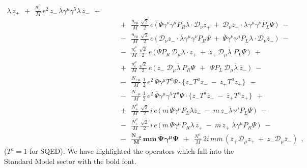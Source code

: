 \documentclass[12pt]{revtex4}
\begin{document}
\begin{eqnarray}
\lambda\, z_+ 
~~+~~
\frac{n_{\bar{e}}^\mu}{M}\, e^2\,
z_-\, \overline{\lambda}\gamma^\mu\gamma^5
\lambda\, \overline{z}_-
~~+~~ \\
\nonumber
&&
~~+~~
\frac{n_{e\mu}}{M}\,
\frac{\sqrt{2}}{2}\, e\,
\Big(\,
\overline{\Psi} \gamma^\nu\gamma^\mu P_R
\lambda \cdot \mathcal{D}_\nu z_+ 
~+~
\mathcal{D}_\nu \overline{z}_+ \cdot
\overline{\lambda} \gamma^\mu \gamma^\nu
P_L \Psi
\,
\Big)
~~-~~ \\
\nonumber
&&
~~-~~
\frac{n_{\bar{e}\mu}}{M}\,
\frac{\sqrt{2}}{2}\,e\,
\Big(\,
\mathcal{D}_\nu z_- \cdot
\overline{\lambda}\gamma^\mu\gamma^\nu P_R \Psi
~+~
\overline{\Psi}\gamma^\nu\gamma^\mu P_L \lambda
\cdot \mathcal{D}_\nu \overline{z}_-
\,
\Big)
~~-~~ \\
\label{LV_matter_component}
&&
~~-~~
\frac{n_e^\mu}{M}\,
\frac{\sqrt{2}}{2}\, e\,
\Big(\,
\overline{\Psi}P_R\, \mathcal{D}_\mu \lambda
\cdot z_+ 
~+~
\overline{z}_+ \,
\mathcal{D}_\mu 
\overline{\lambda}\; P_L \Psi
\,\Big)
~~+~~ \\
\nonumber
&&
~~+~~
\frac{n_{\bar{e}}^\mu}{M}\,
\frac{\sqrt{2}}{2}\, e\,
\Big(\,
z_-\; \mathcal{D}_\mu \overline{\lambda} ~
P_R \Psi 
~~+~~
\Psi P_L \, \mathcal{D}_\mu \overline{\lambda} ~
\overline{z}_-
\,\Big) 
~~-~~ \\
\nonumber
&&
~~-~~ 
\frac{N_{+\mu}}{M}\,
\frac{1}{2}\, e^2\,
\overline{\Psi}\gamma^\mu T^a \Psi \cdot
\Big\{
  z_- T^a \overline{z}_- 
  ~-~
  \overline{z}_+ T^a z_+
\Big\}
~~-~~ \\
\nonumber
&&
~~-~~
\frac{N_{-\mu}}{M}\,
\frac{1}{2}\, e^2\,
\overline{\Psi}\gamma^\mu \gamma^5 T^a \Psi \cdot
\Big\{
  z_- T^a \overline{z}_- 
  ~-~
  \overline{z}_+ T^a z_+
\Big\}
~~+~~ \\
\nonumber
&&
~~+~~
\frac{N_+^\mu}{M}\,
\frac{\sqrt{2}}{2}\, i\, e\,
\Big(\,
\overline{m\, \Psi} \gamma^\mu P_L
\lambda \overline{z}_- 
~-~
m\, z_- \overline{\lambda}
\gamma^\mu P_L \Psi
\,\Big)
~~-~~ \\
\nonumber
&&
~~-~~
\frac{N_+^\mu}{M}\,
\frac{\sqrt{2}}{2}\, i\, e\,
\Big(\,
m\, \overline{\Psi}\gamma^\mu P_R \lambda\, z_+ 
~-~
\overline{m\, z_+}\; \overline{\lambda}
\gamma^\mu P_R \Psi
\,\Big)
~~-~~ \\
\nonumber
&&
~~-~~
\mathbf{
\frac{N_{-\mu}}{M}\,
m \overline{m} \,
\overline{\Psi} \gamma^\mu \Psi
    }
~~+~~ 
\frac{N_-^\mu}{M}\, 2 i\, m \overline{m}\,
\left( 
\overline{z}_+ \mathcal{D}_\mu z_+ 
~+~
z_- \mathcal{D}_\mu \overline{z}_-
\right)
~~,
\end{eqnarray}
($ T^a = 1 $ for SQED).
We have highlighted the operators which fall into the 
Standard Model sector with the bold font.
\end{document}
